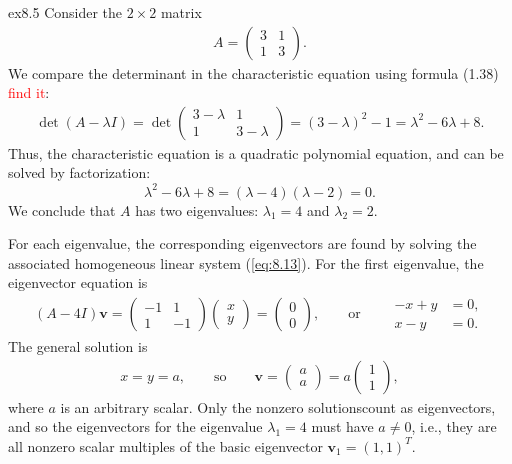 \documentclass[12pt]{article}
\theoremstyle{remark}
\begin{document}
\begin{example}{}{ex8.5}
    Consider the $2\times 2$ matrix
    \begin{align*}
        A = \begin{pmatrix}3 & 1\\
                           1 & 3
            \end{pmatrix}.
    \end{align*}
    We compare the determinant in the characteristic equation using formula (1.38) \textcolor{red}{find it}:
    \begin{align*}
        \det (A-\lambda I) = \det \begin{pmatrix}3-\lambda & 1\\ 1 & 3-\lambda \end{pmatrix} = (3-\lambda)^2 - 1 = \lambda^2 -6\lambda + 8.
    \end{align*}
    Thus, the characteristic equation is a quadratic polynomial equation, and can be solved by factorization:
    \begin{equation*}
        \lambda^2 - 6\lambda + 8 = (\lambda - 4)(\lambda - 2)=0.
    \end{equation*}
    We conclude that $A$ has two eigenvalues: $\lambda_1 = 4$ and $\lambda_2 = 2$.

    For each eigenvalue, the corresponding eigenvectors are found by solving the associated homogeneous linear system (\ref{eq:8.13}). For the first eigenvalue, the eigenvector equation is
    \begin{align*}
        (A-4I)\mathbf{v} = \begin{pmatrix}-1 & 1\\ 1 & -1\end{pmatrix} \begin{pmatrix}x\\ y\end{pmatrix} = \begin{pmatrix} 0\\ 0\end{pmatrix}, \qquad \text{or}\qquad \begin{split} -x + y &= 0,\\ x-y &=0.\end{split}
    \end{align*}
    The general solution is
    \begin{align*}
        x = y = a, \qquad \text{so}\qquad \mathbf{v}= \begin{pmatrix}a\\a\end{pmatrix} = a\begin{pmatrix}1\\1\end{pmatrix},
    \end{align*}
    where $a$ is an arbitrary scalar. Only the nonzero solutions\footnotemark[2]  count as eigenvectors, and so the eigenvectors for the eigenvalue $\lambda_1 = 4$ must have $a\neq 0$, i.e., they are all nonzero scalar multiples of the basic eigenvector $\mathbf{v}_1 = (1,1)^T$.


\end{example}
\end{document}
